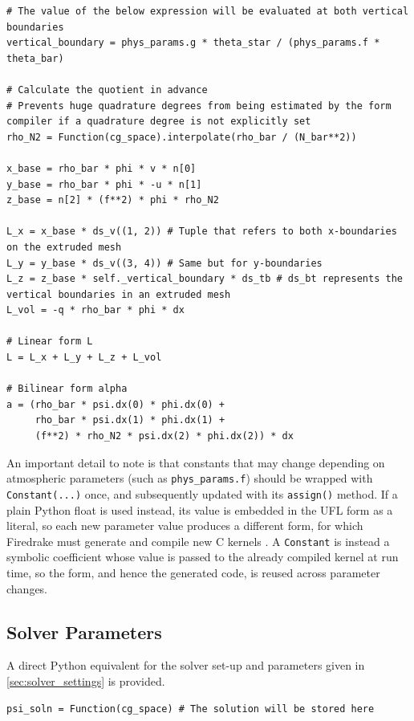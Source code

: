 \documentclass{article}
\begin{document}
\begin{appendices}
\begin{verbatim}
# The value of the below expression will be evaluated at both vertical boundaries
vertical_boundary = phys_params.g * theta_star / (phys_params.f * theta_bar)

# Calculate the quotient in advance
# Prevents huge quadrature degrees from being estimated by the form compiler if a quadrature degree is not explicitly set
rho_N2 = Function(cg_space).interpolate(rho_bar / (N_bar**2))

x_base = rho_bar * phi * v * n[0]
y_base = rho_bar * phi * -u * n[1]
z_base = n[2] * (f**2) * phi * rho_N2

L_x = x_base * ds_v((1, 2)) # Tuple that refers to both x-boundaries on the extruded mesh
L_y = y_base * ds_v((3, 4)) # Same but for y-boundaries
L_z = z_base * self._vertical_boundary * ds_tb # ds_bt represents the vertical boundaries in an extruded mesh
L_vol = -q * rho_bar * phi * dx

# Linear form L
L = L_x + L_y + L_z + L_vol

# Bilinear form alpha
a = (rho_bar * psi.dx(0) * phi.dx(0) +
     rho_bar * psi.dx(1) * phi.dx(1) +
     (f**2) * rho_N2 * psi.dx(2) * phi.dx(2)) * dx
\end{verbatim}

An important detail to note is that constants that may change depending on atmospheric parameters (such as \texttt{phys_params.f}) should be wrapped with \texttt{Constant(...)} once, and subsequently updated with its \texttt{assign()} method.
If a plain Python float is used instead, its value is embedded in the UFL form as a literal, so each new parameter value produces a different form, for which Firedrake must generate and compile new C kernels \cite{FiredrakeUserManual}.
A \texttt{Constant} is instead a symbolic coefficient whose value is passed to the already compiled kernel at run time, so the form, and hence the generated code, is reused across parameter changes.

\subsection{Solver Parameters}\label{app:solver_params}

A direct Python equivalent for the solver set-up and parameters given in \cref{sec:solver_settings} is provided.

\begin{verbatim}
psi_soln = Function(cg_space) # The solution will be stored here


\end{verbatim}
\end{appendices}
\end{document}
